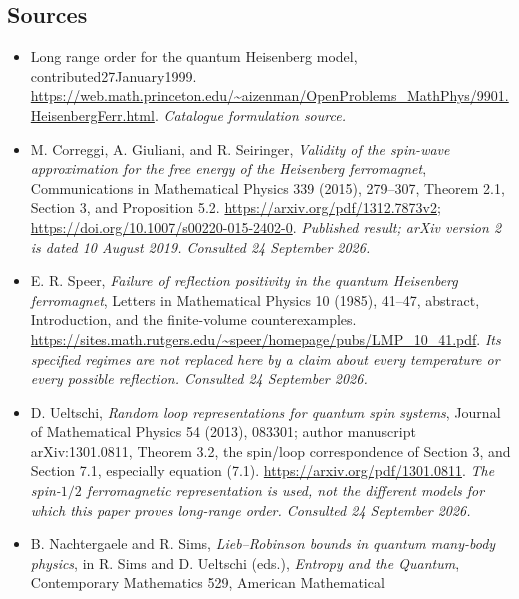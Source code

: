 \documentclass[11pt]{article}
\begin{document}
	\subsection{Sources}
	\begin{itemize}\raggedright
		\item[\textnormal{[S1]}]\hypertarget{source:30006979:1}{} Long range order for the quantum Heisenberg model, contributed27January1999.
		\url{https://web.math.princeton.edu/~aizenman/OpenProblems_MathPhys/9901.HeisenbergFerr.html}.
		{\small\textit{Catalogue formulation source.}}
		\item[\textnormal{[E1]}]\hypertarget{extra:30006979:1}{}
		M. Correggi, A. Giuliani, and R. Seiringer, \emph{Validity of the
			spin-wave approximation for the free energy of the Heisenberg
			ferromagnet}, Communications in Mathematical Physics 339 (2015),
		279--307, Theorem 2.1, Section 3, and Proposition 5.2.
		\url{https://arxiv.org/pdf/1312.7873v2};
		\url{https://doi.org/10.1007/s00220-015-2402-0}.
		{\small\textit{Published result; arXiv version 2 is dated 10 August 2019.
				Consulted 24 September 2026.}}
		\item[\textnormal{[E2]}]\hypertarget{extra:30006979:2}{}
		E. R. Speer, \emph{Failure of reflection positivity in the quantum
			Heisenberg ferromagnet}, Letters in Mathematical Physics 10 (1985),
		41--47, abstract, Introduction, and the finite-volume counterexamples.
		\url{https://sites.math.rutgers.edu/~speer/homepage/pubs/LMP_10_41.pdf}.
		{\small\textit{Its specified regimes are not replaced here by a claim
				about every temperature or every possible reflection. Consulted
				24 September 2026.}}
		\item[\textnormal{[E3]}]\hypertarget{extra:30006979:3}{}
		D. Ueltschi, \emph{Random loop representations for quantum spin systems},
		Journal of Mathematical Physics 54 (2013), 083301; author manuscript
		arXiv:1301.0811, Theorem 3.2, the spin/loop correspondence of Section 3,
		and Section 7.1, especially equation (7.1).
		\url{https://arxiv.org/pdf/1301.0811}.
		{\small\textit{The spin-$1/2$ ferromagnetic representation is used, not
				the different models for which this paper proves long-range order.
				Consulted 24 September 2026.}}
		\item[\textnormal{[E4]}]\hypertarget{extra:30006979:4}{}
		B. Nachtergaele and R. Sims, \emph{Lieb--Robinson bounds in quantum
			many-body physics}, in R. Sims and D. Ueltschi (eds.), \emph{Entropy
			and the Quantum}, Contemporary Mathematics 529, American Mathematical

\end{itemize}
\end{document}
